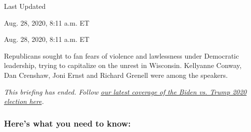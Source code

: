 Last Updated

Aug. 28, 2020, 8:11 a.m. ET

Aug. 28, 2020, 8:11 a.m. ET

Republicans sought to fan fears of violence and lawlessness under
Democratic leadership, trying to capitalize on the unrest in Wisconsin.
Kellyanne Conway, Dan Crenshaw, Joni Ernst and Richard Grenell were
among the speakers.

\emph{This briefing has ended. Follow}
\href{https://www.nytimes3xbfgragh.onion/live/2020/08/27/us/rnc-convention-election}{\emph{our
latest coverage of the Biden vs. Trump 2020 election here}}\emph{.}

\hypertarget{heres-what-you-need-to-know}{%
\subsubsection{Here's what you need to
know:}\label{heres-what-you-need-to-know}}

